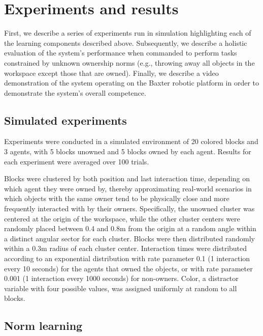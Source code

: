 \documentclass[letterpaper]{article} %
\begin{document}
\section{Experiments and results}

First, we describe a series of experiments run in simulation highlighting each of the learning components described above. Subsequently, we describe a holistic evaluation of the system's performance when commanded to perform tasks constrained by unknown ownership norms (e.g., throwing away all objects in the workspace except those that are owned). Finally, we describe a video demonstration of the system operating on the Baxter robotic platform in order to demonstrate the system's overall competence.

\subsection{Simulated experiments}

Experiments were conducted in a simulated environment of 20 colored blocks and 3 agents, with 5 blocks unowned and 5 blocks owned by each agent. Results for each experiment were averaged over 100 trials.

Blocks were clustered by both position and last interaction time, depending on which agent they were owned by, thereby approximating real-world scenarios in which objects with the same owner tend to be physically close and more frequently interacted with by their owners. Specifically, the unowned cluster was centered at the origin of the workspace, while the other cluster centers were randomly placed between 0.4 and 0.8m from the origin at a random angle within a distinct angular sector for each cluster. Blocks were then distributed randomly within a 0.3m radius of each cluster center. Interaction times were distributed according to an exponential distribution with rate parameter 0.1 (1 interaction every 10 seconds) for the agents that owned the objects, or with rate parameter 0.001 (1 interaction every 1000 seconds) for non-owners. Color, a distractor variable with four possible values, was assigned uniformly at random to all blocks.

\subsection{Norm learning}
\end{document}
